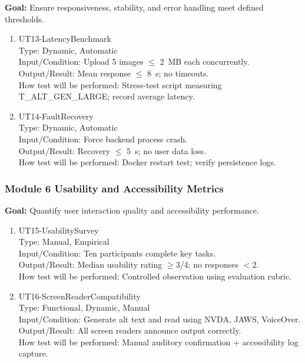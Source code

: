 \documentclass[12pt, titlepage]{article}
\begin{document}
\textbf{Goal:} Ensure responsiveness, stability, and error handling
meet defined thresholds.

\begin{enumerate}
\item{UT13-LatencyBenchmark\\}
  Type: Dynamic, Automatic\\
  Input/Condition: Upload 5 images $\leq$ 2~MB each concurrently.\\
  Output/Result: Mean response $\leq$ 8~s; no timeouts.\\
  How test will be performed: Stress-test script measuring
  T\_ALT\_GEN\_LARGE; record average latency.

\item{UT14-FaultRecovery\\}
  Type: Dynamic, Automatic\\
  Input/Condition: Force backend process crash.\\
  Output/Result: Recovery $\leq$ 5~s; no user data loss.\\
  How test will be performed: Docker restart test; verify persistence logs.
\end{enumerate}

\subsubsection{Module 6 \textemdash{} Usability and Accessibility Metrics}

\textbf{Goal:} Quantify user interaction quality and accessibility performance.

\begin{enumerate}
\item{UT15-UsabilitySurvey\\}
  Type: Manual, Empirical\\
  Input/Condition: Ten participants complete key tasks.\\
  Output/Result: Median usability rating $\geq 3$/4; no responses $<2$.\\
  How test will be performed: Controlled observation using evaluation rubric.

\item{UT16-ScreenReaderCompatibility\\}
  Type: Functional, Dynamic, Manual\\
  Input/Condition: Generate alt text and read using NVDA, JAWS, VoiceOver.\\
  Output/Result: All screen readers announce output correctly.\\
  How test will be performed: Manual auditory confirmation +
  accessibility log capture.
\end{enumerate}
\end{document}
